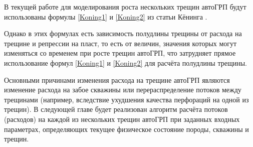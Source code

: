 В текущей работе для моделирования роста нескольких трещин автоГРП будут использованы формулы \eqref{Koning1} и \eqref{Koning2} из статьи Кёнинга \cite{koning}.

Однако в этих формулах есть зависимость полудлины трещины от расхода на трещине и репрессии на пласт, то есть от величин, значения которых могут изменяться со временем при росте трещин автоГРП, что затрудняет прямое использование формул \eqref{Koning1} и \eqref{Koning2} для расчёта полудлины трещины.

Основными причинами изменения расхода на трещине автоГРП являются изменение расхода на забое скважины или перераспределение потоков между трещинами (например, вследствие ухудшения качества перфораций на одной из трещин).
В следующей главе будет реализован алгоритм расчёта потоков (расходов) на каждой из нескольких трещин автоГРП при заданных входных параметрах, определяющих текущее физическое состояние породы, скважины и трещин.




